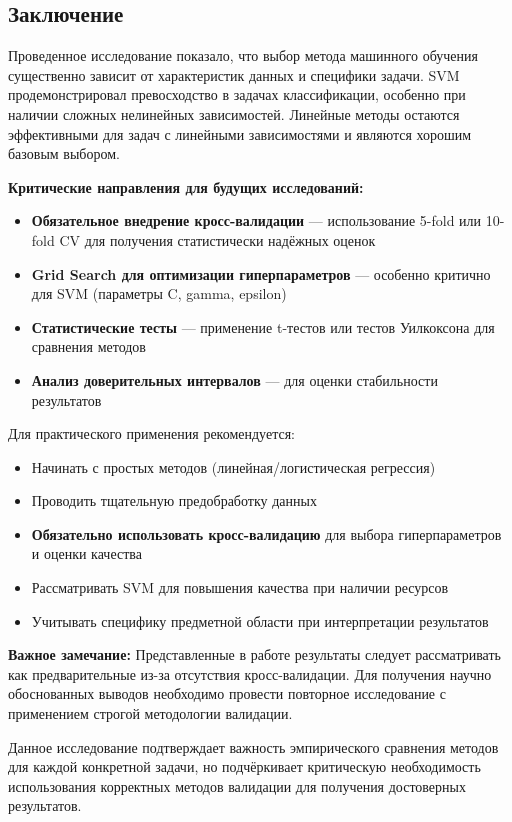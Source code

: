 \documentclass[a4paper]{article}
\begin{document}
\subsection{Заключение}

Проведенное исследование показало, что выбор метода машинного обучения существенно зависит от характеристик данных и специфики задачи. SVM продемонстрировал превосходство в задачах классификации, особенно при наличии сложных нелинейных зависимостей. Линейные методы остаются эффективными для задач с линейными зависимостями и являются хорошим базовым выбором.

\textbf{Критические направления для будущих исследований:}
\begin{itemize}
    \item \textbf{Обязательное внедрение кросс-валидации} — использование 5-fold или 10-fold CV для получения статистически надёжных оценок
    \item \textbf{Grid Search для оптимизации гиперпараметров} — особенно критично для SVM (параметры C, gamma, epsilon)
    \item \textbf{Статистические тесты} — применение t-тестов или тестов Уилкоксона для сравнения методов
    \item \textbf{Анализ доверительных интервалов} — для оценки стабильности результатов
\end{itemize}

Для практического применения рекомендуется:
\begin{itemize}
    \item Начинать с простых методов (линейная/логистическая регрессия)
    \item Проводить тщательную предобработку данных
    \item \textbf{Обязательно использовать кросс-валидацию} для выбора гиперпараметров и оценки качества
    \item Рассматривать SVM для повышения качества при наличии ресурсов
    \item Учитывать специфику предметной области при интерпретации результатов
\end{itemize}

\textbf{Важное замечание:} Представленные в работе результаты следует рассматривать как предварительные из-за отсутствия кросс-валидации. Для получения научно обоснованных выводов необходимо провести повторное исследование с применением строгой методологии валидации.

Данное исследование подтверждает важность эмпирического сравнения методов для каждой конкретной задачи, но подчёркивает критическую необходимость использования корректных методов валидации для получения достоверных результатов.
\end{document}
